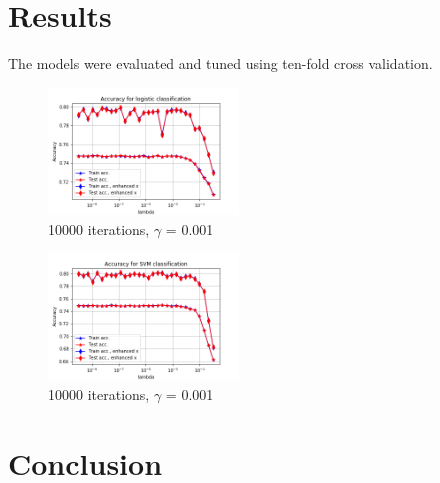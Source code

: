 \documentclass[10pt,conference,compsocconf]{IEEEtran}
\begin{document}
\section*{Results}
The models were evaluated and tuned using ten-fold cross validation. %
\begin{figure}[H]
	\centering
	\includegraphics[width=0.45\textwidth]{accuracy_logistic.png}
	\caption{10000 iterations, $\gamma$ = 0.001}
\end{figure}

\begin{figure}[H]
	\centering
	\includegraphics[width=0.45\textwidth]{accuracy_SVM.png}
	\caption{10000 iterations, $\gamma$ = 0.001}
\end{figure}


\section*{Conclusion}



\end{document}
